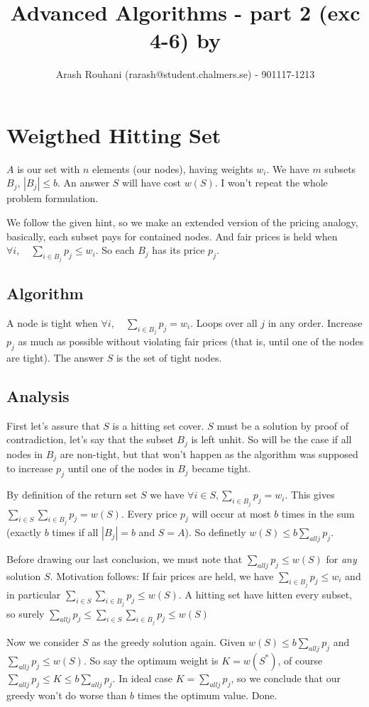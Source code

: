 \documentclass[a4paper,11pt]{article}
\title{Advanced Algorithms - part 2 (exc 4-6) by}
\author{Arash Rouhani (rarash@student.chalmers.se) - 901117-1213}
\begin{document}
\maketitle

\section{Weigthed Hitting Set}

$A$ is our set with $n$ elements (our nodes), having weights $w_i$.
We have $m$ subsets $B_j$, $|B_j| \leq b$. An answer $S$ will have cost $w(S)$.
I won't repeat the whole problem formulation.

We follow the given hint, so we make an extended version of
the pricing analogy, basically, each subset pays for contained nodes.
And fair prices is held when $\forall i, \quad \sum_{i \in B_j} p_j \leq w_i$.
So each $B_j$ has its price $p_j$.

\subsection{Algorithm}

A node is tight when $\forall i, \quad \sum_{i \in B_j} p_j = w_i$.
Loops over all $j$ in any order. Increase $p_j$ as much as possible
without violating fair prices (that is, until one of the nodes are tight).
The answer $S$ is the set of tight nodes.

\subsection{Analysis}

First let's assure that $S$ is a hitting set cover. $S$ must
be a solution by proof of contradiction, let's say that
the subset $B_j$ is left unhit. So will be the case if all nodes in
$B_j$ are non-tight, but that won't happen as the algorithm
was supposed to increase $p_j$ until one of the nodes in $B_j$
became tight.

By definition of the return set $S$ we have
$\forall i \in S, \sum_{i \in B_j} p_j = w_i$.
This gives $ \sum_{i \in S} \sum_{i \in B_j} p_j = w(S)$.
Every price $p_j$ will occur at most $b$ times in the sum
(exactly $b$ times if all $|B_j| = b$ and $S = A$).
So definetly $w(S) \leq b \sum_{all j} p_j$.

Before drawing our last conclusion, we must note that
$\sum_{all j} p_j \leq w(S) $ for \emph{any} solution $S$.
Motivation follows:
If fair prices are held, we have
$\sum_{i \in B_j} p_j \leq w_i$ and in particular
$\sum_{i \in S} \sum_{i \in B_j} p_j \leq w(S)$.
A hitting set have hitten every subset, so surely
$\sum_{all j} p_j \leq \sum_{i \in S} \sum_{i \in B_j} p_j \leq w(S)$

Now we consider $S$ as the greedy solution again.
Given $w(S) \leq b \sum_{all j} p_j$ and $\sum_{all j} p_j \leq w(S)$.
So say the optimum weight is $K=w(S^*)$, of course
$\sum_{all j} p_j \leq K \leq b \sum_{all j} p_j$.
In ideal case $K = \sum_{all j} p_j$,
so we conclude that our greedy won't do worse than $b$
times the optimum value. Done.
\end{document}
